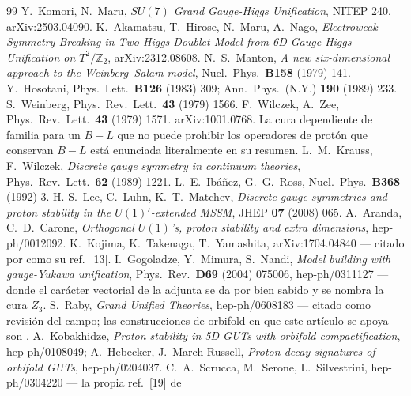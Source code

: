 \documentclass[11pt,a4paper]{article}
\newcommand{\ZZ}{\mathbb{Z}}
\begin{document}
\begin{thebibliography}{99}\small
\setlength{\itemsep}{0pt plus 1pt}
 Y.~Komori, N.~Maru, \emph{$SU(7)$ Grand Gauge-Higgs Unification}, NITEP 240,
arXiv:2503.04090.
 K.~Akamatsu, T.~Hirose, N.~Maru, A.~Nago, \emph{Electroweak Symmetry Breaking in Two
Higgs Doublet Model from 6D Gauge-Higgs Unification on $T^2/\ZZ_2$}, arXiv:2312.08608.
 N.~S.~Manton, \emph{A new six-dimensional approach to the Weinberg--Salam model},
Nucl.\ Phys.\ \textbf{B158} (1979) 141.
 Y.~Hosotani, Phys.\ Lett.\ \textbf{B126} (1983) 309; Ann.\ Phys.\ (N.Y.)
\textbf{190} (1989) 233.
 S.~Weinberg, Phys.\ Rev.\ Lett.\ \textbf{43} (1979) 1566.
 F.~Wilczek, A.~Zee, Phys.\ Rev.\ Lett.\ \textbf{43} (1979) 1571.
 arXiv:1001.0768. La cura dependiente de familia para un $B-L$ que no puede
prohibir los operadores de protón que conservan $B-L$ está enunciada literalmente en su resumen.
 L.~M.~Krauss, F.~Wilczek, \emph{Discrete gauge symmetry in continuum theories}, Phys.\
Rev.\ Lett.\ \textbf{62} (1989) 1221.
 L.~E.~Ib\'a\~nez, G.~G.~Ross, Nucl.\ Phys.\ \textbf{B368} (1992) 3.
\bibitem{DiscGauge} H.-S.~Lee, C.~Luhn, K.~T.~Matchev, \emph{Discrete gauge symmetries and proton
stability in the $U(1)'$-extended
MSSM}, JHEP \textbf{07} (2008) 065.
 A.~Aranda, C.~D.~Carone, \emph{Orthogonal $U(1)$'s, proton stability and extra
dimensions}, hep-ph/0012092.
 K.~Kojima, K.~Takenaga, T.~Yamashita, arXiv:1704.04840 --- citado por \cite{KM25} como
su ref.~[13].
 I.~Gogoladze, Y.~Mimura, S.~Nandi, \emph{Model building with gauge-Yukawa
unification}, Phys.\ Rev.\ \textbf{D69} (2004) 075006, hep-ph/0311127 --- donde el carácter vectorial
de la adjunta se da por bien sabido y se nombra la cura $Z_3$.
 S.~Raby, \emph{Grand Unified Theories}, hep-ph/0608183 --- citado como revisión del
campo; las construcciones de orbifold en que este artículo se apoya son \cite{OrbGUT}.
\bibitem{OrbGUT} A.~Kobakhidze, \emph{Proton stability in 5D GUTs with orbifold compactification},
hep-ph/0108049; A.~Hebecker, J.~March-Russell, \emph{Proton decay signatures of orbifold GUTs},
hep-ph/0204037.
 C.~A.~Scrucca, M.~Serone, L.~Silvestrini, hep-ph/0304220 --- la propia ref.~[19] de

\end{thebibliography}
\end{document}
